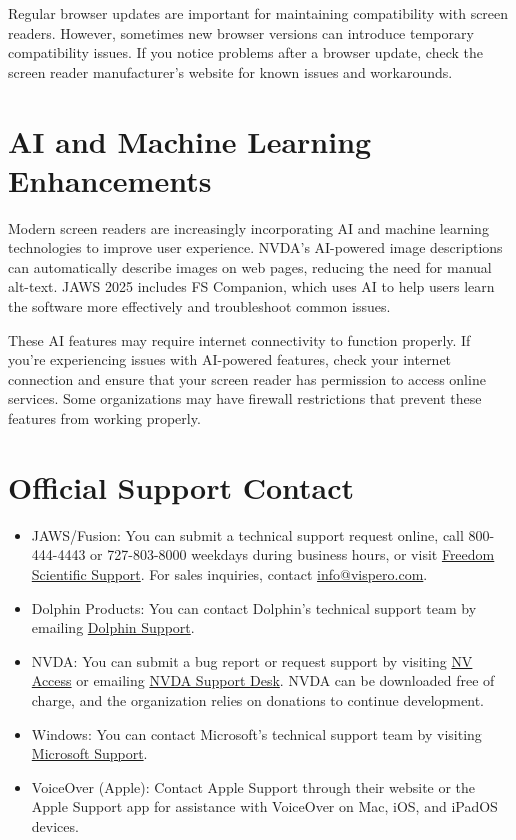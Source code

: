 Regular browser updates are important for maintaining compatibility with screen readers. However, sometimes new browser versions can introduce temporary compatibility issues. If you notice problems after a browser update, check the screen reader manufacturer's website for known issues and workarounds.

\section{AI and Machine Learning Enhancements}\label{ai}
Modern screen readers are increasingly incorporating AI and machine learning technologies to improve user experience. NVDA's AI-powered image descriptions can automatically describe images on web pages, reducing the need for manual alt-text. JAWS 2025 includes FS Companion, which uses AI to help users learn the software more effectively and troubleshoot common issues.

These AI features may require internet connectivity to function properly. If you're experiencing issues with AI-powered features, check your internet connection and ensure that your screen reader has permission to access online services. Some organizations may have firewall restrictions that prevent these features from working properly.

\section{Official Support Contact}\label{report}
\begin{itemize}
 \item JAWS/Fusion: You can submit a technical support request online, call 800-444-4443 or 727-803-8000 weekdays during business hours, or visit \href{https://support.freedomscientific.com/support}{Freedom Scientific Support}. For sales inquiries, contact \href{mailto:info@vispero.com}{info@vispero.com}.
 \item Dolphin Products: You can contact Dolphin's technical support team by emailing \href{mailto:support@yourdolphin.com}{Dolphin Support}.
 \item NVDA: You can submit a bug report or request support by visiting \href{https://www.nvaccess.org/}{NV Access} or emailing \href{mailto:info@nvaccess.org}{NVDA Support Desk}. NVDA can be downloaded free of charge, and the organization relies on donations to continue development.
 \item Windows: You can contact Microsoft's technical support team by visiting \href{https://support.microsoft.com/}{Microsoft Support}.
 \item VoiceOver (Apple): Contact Apple Support through their website or the Apple Support app for assistance with VoiceOver on Mac, iOS, and iPadOS devices.
\end{itemize}

